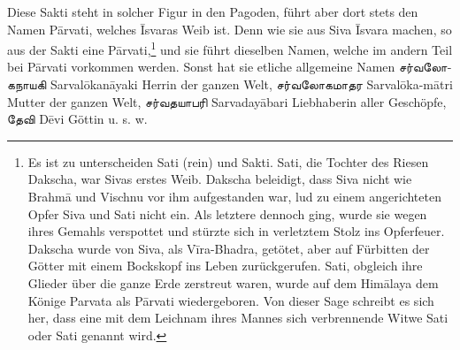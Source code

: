 \documentclass{article}
\newcommand{\TamilText}[1]{\texttamil{#1}}
\newcommand{\tam}[1]{\TamilText{#1}}
\begin{document}
Diese Sakti steht in solcher Figur in den Pagoden, führt aber dort stets den Namen P\={a}rvati, welches \={I}svaras Weib ist. Denn wie sie aus Siva \={I}svara machen, so aus der Sakti eine P\={a}rvati,\footnote{Es ist zu unterscheiden Sati (rein) und Sakti. Sati, die Tochter des Riesen Dakscha, war Sivas erstes Weib. Dakscha beleidigt, dass Siva nicht wie Brahm\={a} und Vischnu vor ihm aufgestanden war, lud zu einem angerichteten Opfer Siva und Sati nicht ein. Als letztere dennoch ging, wurde sie wegen ihres Gemahls verspottet und stürzte sich in verletztem Stolz ins Opferfeuer. Dakscha wurde von Siva, als V\={i}ra-Bhadra, getötet, aber auf Fürbitten der Götter mit einem Bockskopf ins Leben zurückgerufen. Sati, obgleich ihre Glieder über die ganze Erde zerstreut waren, wurde auf dem Him\={a}laya dem Könige Parvata als P\={a}rvati wiedergeboren. Von dieser Sage schreibt es sich her, dass eine mit dem Leichnam ihres Mannes sich verbrennende Witwe Sati oder Sati genannt wird.} und sie führt dieselben Namen, welche im andern Teil bei P\={a}rvati vorkommen werden. Sonst hat sie etliche allgemeine Namen \tam{சர்வலோகநாயகி} Sarval\={o}kan\={a}yaki Herrin der ganzen Welt, \tam{சர்வலோகமாதர} Sarval\={o}ka-m\={a}tri Mutter der ganzen Welt, \tam{சர்வதயாபரி} Sarvaday\={a}bari Liebhaberin aller Geschöpfe, \tam{தேவி} D\={e}vi Göttin u. s. w.
\end{document}
